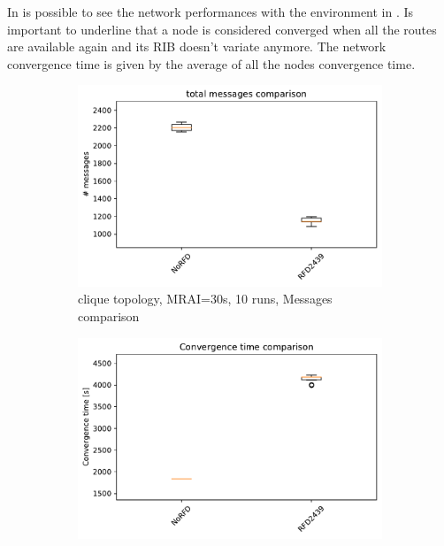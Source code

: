 In  is possible to see the network performances with
the environment in .
Is important to underline that a node is considered converged when all the routes
are available again and its \ac{RIB} doesn't variate anymore.
The network convergence time is given by the average of all the nodes convergence
time.
\begin{figure}[h]
     \centering
     \begin{subfigure}[b]{0.49\textwidth}
         \centering
         \includegraphics[width=\textwidth]{images/RFD/clique/clique_rfd_comparison_2439_messages_boxplot.pdf}
         \caption{clique topology, MRAI=30s, 10 runs, Messages comparison}
         \label{fig:RFD_2439_clique_MRAI30_messages}
     \end{subfigure}
     \hfill
     \begin{subfigure}[b]{0.49\textwidth}
         \centering
         \includegraphics[width=\textwidth]{images/RFD/clique/clique_rfd_comparison_2439_time_boxplot.pdf}

\end{subfigure}
\end{figure}
